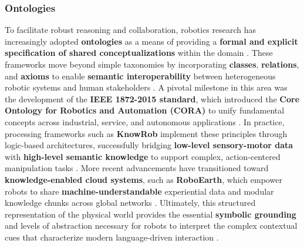 \documentclass[a4paper]{article}
\begin{document}
\subsubsection{Ontologies}
To facilitate robust reasoning and collaboration, robotics research has increasingly adopted \textbf{ontologies} as a means of providing a \textbf{formal and explicit specification of shared conceptualizations} within the domain \cite{prestes2013towards}. These frameworks move beyond simple taxonomies by incorporating \textbf{classes}, \textbf{relations}, and \textbf{axioms} to enable \textbf{semantic interoperability} between heterogeneous robotic systems and human stakeholders \cite{haidegger2013applied, olszewska2017ontology}. A pivotal milestone in this area was the development of the \textbf{IEEE 1872-2015 standard}, which introduced the \textbf{Core Ontology for Robotics and Automation (CORA)} to unify fundamental concepts across industrial, service, and autonomous applications \cite{schlenoff2012ieee}. In practice, processing frameworks such as \textbf{KnowRob} implement these principles through logic-based architectures, successfully bridging \textbf{low-level sensory-motor data} with \textbf{high-level semantic knowledge} to support complex, action-centered manipulation tasks \cite{tenorth2009knowrob}. More recent advancements have transitioned toward \textbf{knowledge-enabled cloud systems}, such as \textbf{RoboEarth}, which empower robots to share \textbf{machine-understandable} experiential data and modular knowledge chunks across global networks \cite{olivares2019review}. Ultimately, this structured representation of the physical world provides the essential \textbf{symbolic grounding} and levels of abstraction necessary for robots to interpret the complex contextual cues that characterize modern language-driven interaction \cite{ahn2022can}.
\end{document}
